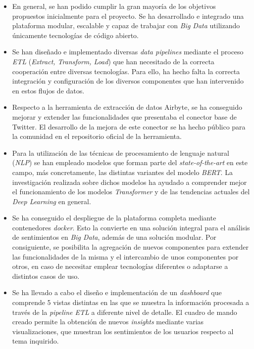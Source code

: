 \begin{itemize}
    \item En general, se han podido cumplir la gran mayoría de los objetivos propuestos inicialmente para el proyecto. Se ha desarrollado e integrado una plataforma modular, escalable y capaz de trabajar con \textit{Big Data} utilizando únicamente tecnologías de código abierto.

    \item Se han diseñado e implementado diversas \textit{data pipelines} mediante el proceso \textit{ETL} (\textit{Extract, Transform, Load}) que han necesitado de la correcta cooperación entre diversas tecnologías. Para ello, ha hecho falta la correcta integración y configuración de los diversos componentes que han intervenido en estos flujos de datos.

    \item Respecto a la herramienta de extracción de datos Airbyte, se ha conseguido mejorar y extender las funcionalidades que presentaba el conector base de Twitter. El desarrollo de la mejora de este conector se ha hecho público para la comunidad en el repositorio oficial de la herramienta.

    \item Para la utilización de las técnicas de procesamiento de lenguaje natural (\textit{NLP}) se han empleado modelos que forman parte del \textit{state-of-the-art} en este campo, más concretamente, las distintas variantes del modelo \textit{BERT}. La investigación realizada sobre dichos modelos ha ayudado a comprender mejor el funcionamiento de los modelos \textit{Transformer} y de las tendencias actuales del \textit{Deep Learning} en general.

    \item Se ha conseguido el despliegue de la plataforma completa mediante contenedores \textit{docker}. Esto la convierte en una solución integral para el análisis de sentimientos en \textit{Big Data}, además de una solución modular. Por consiguiente, se posibilita la agregación de nuevos componentes para extender las funcionalidades de la misma y el intercambio de unos componentes por otros, en caso de necesitar emplear tecnologías diferentes o adaptarse a distintos casos de uso.

    \item Se ha llevado a cabo el diseño e implementación de un \textit{dashboard} que comprende 5 vistas distintas en las que se muestra la información procesada a través de la \textit{pipeline ETL} a diferente nivel de detalle. El cuadro de mando creado permite la obtención de nuevos \textit{insights} mediante varias visualizaciones, que muestran los sentimientos de los usuarios respecto al tema inquirido.


\end{itemize}
